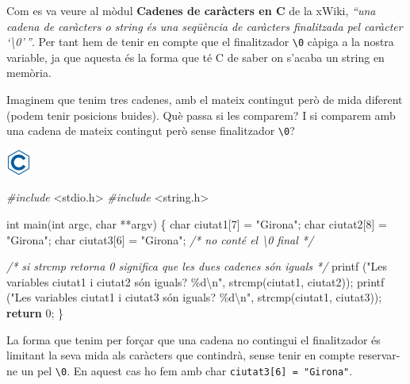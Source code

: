\documentclass[
]{book}
\newenvironment{Shaded}{\begin{snugshade}}{\end{snugshade}}
\newcommand{\CommentTok}[1]{\textcolor[rgb]{0.56,0.35,0.01}{\textit{#1}}}
\newcommand{\ControlFlowTok}[1]{\textcolor[rgb]{0.13,0.29,0.53}{\textbf{#1}}}
\newcommand{\DataTypeTok}[1]{\textcolor[rgb]{0.13,0.29,0.53}{#1}}
\newcommand{\DecValTok}[1]{\textcolor[rgb]{0.00,0.00,0.81}{#1}}
\newcommand{\ImportTok}[1]{#1}
\newcommand{\NormalTok}[1]{#1}
\newcommand{\PreprocessorTok}[1]{\textcolor[rgb]{0.56,0.35,0.01}{\textit{#1}}}
\newcommand{\SpecialCharTok}[1]{\textcolor[rgb]{0.00,0.00,0.00}{#1}}
\newcommand{\StringTok}[1]{\textcolor[rgb]{0.31,0.60,0.02}{#1}}
\begin{document}
Com es va veure al mòdul \textbf{Cadenes de caràcters en C} de la xWiki, \emph{``una cadena de caràcters o string és una seqüència de caràcters finalitzada pel caràcter `\textbackslash0'\,''}. Per tant hem de tenir en compte que el finalitzador \texttt{\textquotesingle{}\textbackslash{}0\textquotesingle{}} càpiga a la nostra variable, ja que aquesta és la forma que té C de saber on s'acaba un string en memòria.

Imaginem que tenim tres cadenes, amb el mateix contingut però de mida diferent (podem tenir posicions buides). Què passa si les comparem? I si comparem amb una cadena de mateix contingut però sense finalitzador \texttt{\textquotesingle{}\textbackslash{}0\textquotesingle{}}?

\includegraphics{./img/c.png}

\begin{Shaded}
\begin{Highlighting}[]
\PreprocessorTok{\#include }\ImportTok{\textless{}stdio.h\textgreater{}}
\PreprocessorTok{\#include }\ImportTok{\textless{}string.h\textgreater{}}

\DataTypeTok{int}\NormalTok{ main(}\DataTypeTok{int}\NormalTok{ argc, }\DataTypeTok{char}\NormalTok{ **argv) \{}
    \DataTypeTok{char}\NormalTok{ ciutat1[}\DecValTok{7}\NormalTok{] = }\StringTok{"Girona"}\NormalTok{;}
    \DataTypeTok{char}\NormalTok{ ciutat2[}\DecValTok{8}\NormalTok{] = }\StringTok{"Girona"}\NormalTok{;}
    \DataTypeTok{char}\NormalTok{ ciutat3[}\DecValTok{6}\NormalTok{] = }\StringTok{"Girona"}\NormalTok{; }\CommentTok{/* no conté el \textquotesingle{}\textbackslash{}0\textquotesingle{} final */}

    \CommentTok{/* si strcmp retorna 0 significa que les dues cadenes són iguals */}
\NormalTok{    printf (}\StringTok{"Les variables ciutat1 i ciutat2 són iguals? \%d}\SpecialCharTok{\textbackslash{}n}\StringTok{"}\NormalTok{, strcmp(ciutat1, ciutat2));}
\NormalTok{    printf (}\StringTok{"Les variables ciutat1 i ciutat3 són iguals? \%d}\SpecialCharTok{\textbackslash{}n}\StringTok{"}\NormalTok{, strcmp(ciutat1, ciutat3));}
    \ControlFlowTok{return} \DecValTok{0}\NormalTok{;}
\NormalTok{\}}
\end{Highlighting}
\end{Shaded}

La forma que tenim per forçar que una cadena no contingui el finalitzador és limitant la seva mida als caràcters que contindrà, sense tenir en compte reservar-ne un pel \texttt{\textquotesingle{}\textbackslash{}0\textquotesingle{}}. En aquest cas ho fem amb char \texttt{ciutat3{[}6{]}\ =\ "Girona"}.
\end{document}
